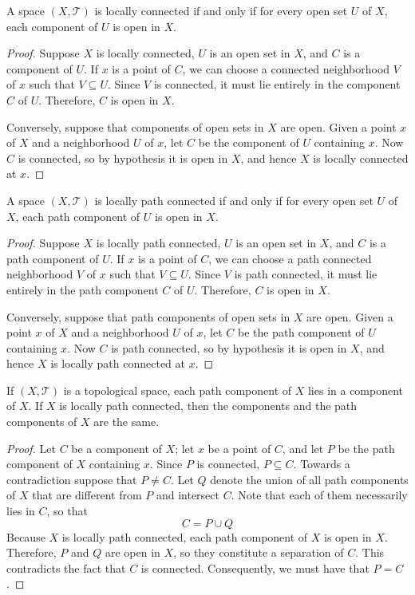 \documentclass[12pt, a4paper, oneside, openright, titlepage]{book}
\begin{document}
\begin{thm}
    A space $(X,\mathcal{T})$ is locally connected if and only if for every open set $U$ of $X$, each component of $U$ is open in $X$.
\end{thm}
\begin{proof}
    Suppose $X$ is locally connected, $U$ is an open set in $X$, and $C$ is a component of $U$. If $x$ is a point of $C$, we can choose a connected neighborhood $V$ of $x$ such that $V \subseteq U$. Since $V$ is connected, it must lie entirely in the component $C$ of $U$. Therefore, $C$ is open in $X$.

    Conversely, suppose that components of open sets in $X$ are open. Given a point $x$ of $X$ and a neighborhood $U$ of $x$, let $C$ be the component of $U$ containing $x$. Now $C$ is connected, so by hypothesis it is open in $X$, and hence $X$ is locally connected at $x$.
\end{proof}

\begin{thm}
    A space $(X,\mathcal{T})$ is locally path connected if and only if for every open set $U$ of $X$, each path component of $U$ is open in $X$.
\end{thm}
\begin{proof}
    Suppose $X$ is locally path connected, $U$ is an open set in $X$, and $C$ is a path component of $U$. If $x$ is a point of $C$, we can choose a path connected neighborhood $V$ of $x$ such that $V \subseteq U$. Since $V$ is path connected, it must lie entirely in the path component $C$ of $U$. Therefore, $C$ is open in $X$.

    Conversely, suppose that path components of open sets in $X$ are open. Given a point $x$ of $X$ and a neighborhood $U$ of $x$, let $C$ be the path component of $U$ containing $x$. Now $C$ is path connected, so by hypothesis it is open in $X$, and hence $X$ is locally path connected at $x$.
\end{proof}


\begin{thm}
    If $(X,\mathcal{T})$ is a topological space, each path component of $X$ lies in a component of $X$. If $X$ is locally path connected, then the components and the path components of $X$ are the same.
\end{thm}
\begin{proof}
    Let $C$ be a component of $X$; let $x$ be a point of $C$, and let $P$ be the path component of $X$ containing $x$. Since $P$ is connected, $P\subseteq C$. Towards a contradiction suppose that $P \neq C$. Let $Q$ denote the union of all path components of $X$ that are different from $P$ and intersect $C$. Note that each of them necessarily lies in $C$, so that \begin{equation*}
        C = P\cup Q
    \end{equation*}
    Because $X$ is locally path connected, each path component of $X$ is open in $X$. Therefore, $P$ and $Q$ are open in $X$, so they constitute a separation of $C$. This contradicts the fact that $C$ is connected. Consequently, we must have that $P = C$.
\end{proof}
\end{document}
